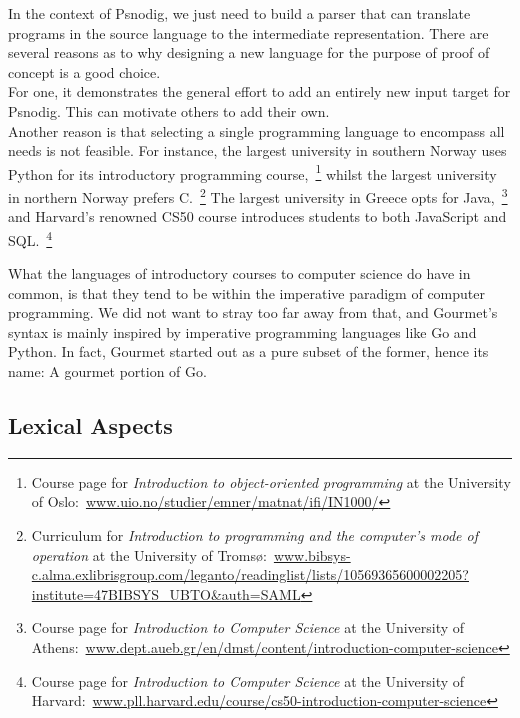 In the context of Psnodig, we just need to build a parser that can translate programs in the source language to the intermediate representation. There are several reasons as to why designing a new language for the purpose of proof of concept is a good choice. \hfill \\

For one, it demonstrates the general effort to add an entirely new input target for Psnodig. This can motivate others to add their own. \hfill \\

Another reason is that selecting a single programming language to encompass all needs is not feasible. For instance, the largest university in southern Norway uses Python for its introductory programming course,~\footnote{Course page for \textit{Introduction to object-oriented programming} at the University of Oslo:~\url{www.uio.no/studier/emner/matnat/ifi/IN1000/}} whilst the largest university in northern Norway prefers C.~\footnote{Curriculum for \textit{Introduction to programming and the computer's mode of operation} at the University of Tromsø:~\url{www.bibsys-c.alma.exlibrisgroup.com/leganto/readinglist/lists/10569365600002205?institute=47BIBSYS_UBTO&auth=SAML}} The largest university in Greece opts for Java,~\footnote{Course page for \textit{Introduction to Computer Science} at the University of Athens:~\url{www.dept.aueb.gr/en/dmst/content/introduction-computer-science}} and Harvard's renowned CS50 course introduces students to both JavaScript and SQL.~\footnote{Course page for \textit{Introduction to Computer Science} at the University of Harvard:~\url{www.pll.harvard.edu/course/cs50-introduction-computer-science}} \hfill \\


What the languages of introductory courses to computer science do have in common, is that they tend to be within the imperative paradigm of computer programming. We did not want to stray too far away from that, and Gourmet's syntax is mainly inspired by imperative programming languages like Go and Python. In fact, Gourmet started out as a pure subset of the former, hence its name: A gourmet portion of Go.

\subsection{Lexical Aspects}

